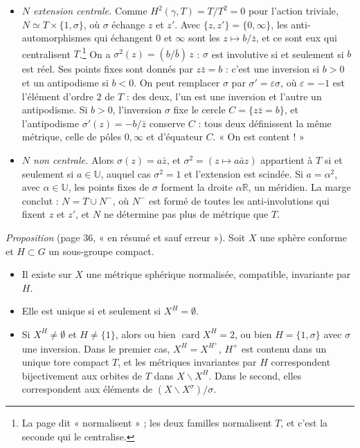 \documentclass[11pt,a4paper]{article}
\begin{document}
\begin{itemize}
  \item[1)] \emph{$N$ extension centrale.} Comme $H^{2}(\gamma, T) =
  T/T^{2} = 0$ pour l'action triviale, $N \simeq T \times \{1, \sigma\}$, où
  $\sigma$ échange $z$ et $z'$. Avec $\{z,z'\} = \{0, \infty\}$, les
  anti-automorphismes qui échangent $0$ et $\infty$ sont les
  $z \mapsto b/\bar z$, et ce sont eux qui centralisent $T$.\footnote{La page
  dit « normalisent » ; les deux familles normalisent $T$, et c'est la
  seconde qui le centralise.} On a $\sigma^{2}(z) = (b/\bar b)\,z$ : $\sigma$
  est involutive si et seulement si $b$ est réel. Ses points fixes sont donnés
  par $z\bar z = b$ : c'est une inversion si $b > 0$ et un antipodisme si
  $b < 0$. On peut remplacer $\sigma$ par $\sigma' = \varepsilon\sigma$, où
  $\varepsilon = -1$ est l'élément d'ordre $2$ de $T$ : des deux, l'un est
  une inversion et l'autre un antipodisme. Si $b > 0$, l'inversion $\sigma$
  fixe le cercle $C = \{z\bar z = b\}$, et l'antipodisme
  $\sigma'(z) = -b/\bar z$ conserve $C$ : tous deux définissent la même
  métrique, celle de pôles $0, \infty$ et d'équateur $C$. « On est
  content ! »
  \item[2)] \emph{$N$ non centrale.} Alors $\sigma(z) = a\bar z$, et
  $\sigma^{2} = (z \mapsto a\bar a z)$ appartient à $T$ si et seulement si
  $a \in \mathbb{U}$, auquel cas $\sigma^{2} = 1$ et l'extension est scindée.
  Si $a = \alpha^{2}$, avec $\alpha \in \mathbb{U}$, les points fixes de
  $\sigma$ forment la droite $\alpha\mathbb{R}$, un méridien. La marge
  conclut : $N = T \cup N^{-}$, où $N^{-}$ est formé de toutes les
  anti-involutions qui fixent $z$ et $z'$, et $N$ ne détermine pas plus de
  métrique que $T$.
\end{itemize}

\emph{Proposition} (page 36, « en résumé et sauf erreur »). Soit $X$ une
sphère conforme et $H \subset G$ un sous-groupe compact.
\begin{itemize}
  \item[a)] Il existe sur $X$ une métrique sphérique normalisée, compatible,
  invariante par $H$.
  \item[b)] Elle est unique si et seulement si $X^{H} = \emptyset$.
  \item[c)] Si $X^{H} \neq \emptyset$ et $H \neq \{1\}$, alors ou bien
  $\operatorname{card} X^{H} = 2$, ou bien $H = \{1,\sigma\}$ avec $\sigma$
  une inversion. Dans le premier cas, $X^{H} = X^{H^{+}}$, $H^{+}$ est
  contenu dans un unique tore compact $T$, et les métriques invariantes par
  $H$ correspondent bijectivement aux orbites de $T$ dans
  $X \smallsetminus X^{H}$. Dans le second, elles correspondent aux éléments de
  $(X \smallsetminus X^{\sigma})/\sigma$.
\end{itemize}
\end{document}
